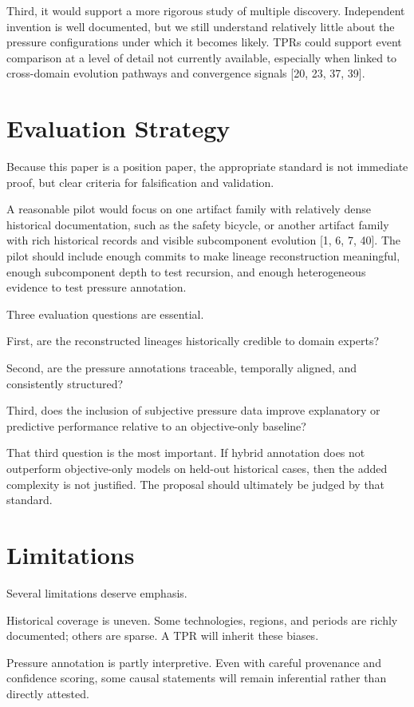 \documentclass[11pt]{article}
\begin{document}
Third, it would support a more rigorous study of multiple discovery. Independent invention is well documented, but we still understand relatively little about the pressure configurations under which it becomes likely. TPRs could support event comparison at a level of detail not currently available, especially when linked to cross-domain evolution pathways and convergence signals [20, 23, 37, 39].

\section{Evaluation Strategy}
Because this paper is a position paper, the appropriate standard is not immediate proof, but clear criteria for falsification and validation.

A reasonable pilot would focus on one artifact family with relatively dense historical documentation, such as the safety bicycle, or another artifact family with rich historical records and visible subcomponent evolution [1, 6, 7, 40]. The pilot should include enough commits to make lineage reconstruction meaningful, enough subcomponent depth to test recursion, and enough heterogeneous evidence to test pressure annotation.

Three evaluation questions are essential.

First, are the reconstructed lineages historically credible to domain experts?

Second, are the pressure annotations traceable, temporally aligned, and consistently structured?

Third, does the inclusion of subjective pressure data improve explanatory or predictive performance relative to an objective-only baseline?

That third question is the most important. If hybrid annotation does not outperform objective-only models on held-out historical cases, then the added complexity is not justified. The proposal should ultimately be judged by that standard.

\section{Limitations}
Several limitations deserve emphasis.

Historical coverage is uneven. Some technologies, regions, and periods are richly documented; others are sparse. A TPR will inherit these biases.

Pressure annotation is partly interpretive. Even with careful provenance and confidence scoring, some causal statements will remain inferential rather than directly attested.
\end{document}
